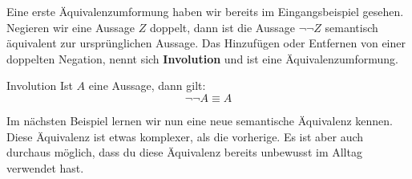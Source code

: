 \documentclass[../../main.tex]{subfiles}
\begin{document}
    

    Eine erste Äquivalenzumformung haben wir bereits im Eingangsbeispiel gesehen. 
    Negieren wir eine 
    Aussage $Z$ doppelt, dann ist die Aussage $\lnot \lnot Z$ semantisch äquivalent zur ursprünglichen Aussage. Das Hinzufügen oder
     Entfernen von einer doppelten Negation, nennt sich \textbf{Involution} und ist eine Äquivalenzumformung.

    \begin{theorem}{Involution}
    Ist $A$ eine Aussage, dann gilt:
        \[\lnot \lnot A \equiv A\]
    \end{theorem}
     
    Im nächsten Beispiel lernen wir nun eine neue semantische Äquivalenz kennen. Diese Äquivalenz
    ist etwas komplexer, als die vorherige. Es ist aber auch durchaus möglich, dass du diese
    Äquivalenz bereits unbewusst im Alltag verwendet hast.
    
\end{document}
